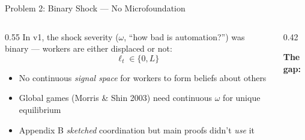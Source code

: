 \documentclass[
  ignorenonframetext,
  aspectratio=169]{beamer}
\begin{document}
\begin{frame}{Problem 2: Binary Shock --- No Microfoundation}
\protect{}\label{problem-2-binary-shock-no-microfoundation}
\begin{columns}[T]
\begin{column}{0.55\textwidth}
In v1, the shock severity ($\omega$, ``how bad is automation?'') was binary --- workers are either displaced or not:
$$\ell_t \in \{0, L\}$$
\begin{itemize}
  \item No continuous \emph{signal space} for workers to form beliefs about others
  \item Global games (Morris \& Shin 2003) need continuous $\omega$ for unique equilibrium
  \item Appendix B \emph{sketched} coordination but main proofs didn't \emph{use} it
\end{itemize}
\end{column}
\begin{column}{0.42\textwidth}
\begin{center}
\textbf{The gap:}\\[6pt]
\end{center}
\end{column}
\end{columns}
\end{frame}
\end{document}
